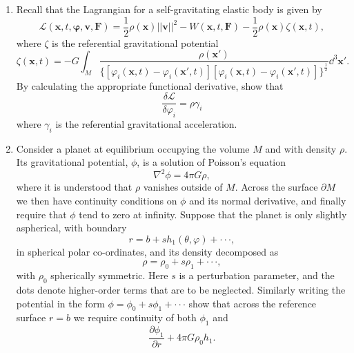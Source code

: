 \documentclass[a4paper,10pt]{paper}
\begin{document}
\begin{enumerate}
\item Recall that the Lagrangian for a self-gravitating elastic body is given by
\begin{equation*}
    \mathcal{L}(\mathbf{x},t,\boldsymbol{\varphi},\mathbf{v},\mathbf{F})=\frac{1}{2}\rho(\mathbf{x})||\mathbf{v}||^{2}-W(\mathbf{x},t,\mathbf{F})-\frac{1}{2}\rho(\mathbf{x})\zeta(\mathbf{x},t),
\end{equation*}
where $\zeta$ is the referential gravitational potential
\begin{equation*}
    \zeta(\mathbf{x},t)=-G\int_{M}\frac{\rho(\mathbf{x}')}{\{[\varphi_{i}(\mathbf{x},t)-\varphi_{i}(\mathbf{x}',t)][\varphi_{i}(\mathbf{x},t)-\varphi_{i}(\mathbf{x}',t)]\}^{\frac{1}{2}}}\dd^{3}\mathbf{x}'.
\end{equation*}
By calculating the appropriate functional derivative, show that
\begin{equation*}
    \frac{\delta\mathcal{L}}{\delta\varphi_{i}}=\rho\gamma_{i}
\end{equation*}
where $\gamma_{i}$ is the referential gravitational acceleration.

\item Consider a planet at equilibrium occupying the volume $M$ and with density $\rho$. Its gravitational potential, $\phi$, is a solution of Poisson's equation
\begin{equation*}
    \nabla^{2}\phi=4\pi G\rho,
\end{equation*}
where it is understood that $\rho$ vanishes outside of $M$. Across the surface $\partial M$ we then have continuity conditions on $\phi$ and its normal derivative, and finally require that $\phi$ tend to zero at infinity. Suppose that the planet is only slightly aspherical, with boundary
\begin{equation*}
    r=b+sh_{1}(\theta,\varphi)+\cdot\cdot\cdot,
\end{equation*}
in spherical polar co-ordinates, and its density decomposed as
\begin{equation*}
    \rho=\rho_{0}+s \rho_{1}+\cdot\cdot\cdot,
\end{equation*}
with $\rho_{0}$ spherically symmetric. Here $s$ is a perturbation parameter, and the dots denote higher-order terms that are to be neglected. Similarly writing the potential in the form $\phi=\phi_{0}+s \phi_{1}+\cdot\cdot\cdot$ show that across the reference surface $r=b$ we require continuity of both $\phi_{1}$ and
\begin{equation*}
    \frac{\partial\phi_{1}}{\partial r}+4\pi G\rho_{0}h_{1}.
\end{equation*}


\end{enumerate}
\end{document}
